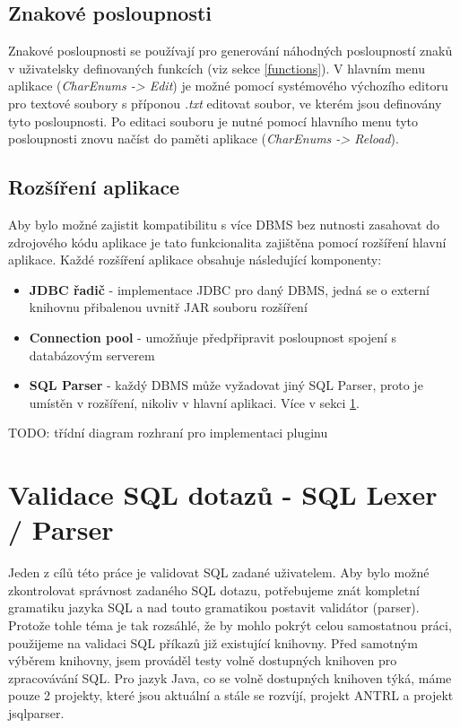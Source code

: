 \documentclass[czech,bachelor,public,dept460,male,cpdeclaration,twoside]{diploma}
\begin{document}
\subsection{Znakové posloupnosti} \label{charenums}
Znakové posloupnosti se používají pro generování náhodných posloupností znaků v uživatelsky definovaných funkcích (viz sekce \ref{functions}). V hlavním menu aplikace (\textit{CharEnums -> Edit}) je možné pomocí systémového výchozího editoru pro textové soubory s příponou \textit{.txt} editovat soubor, ve kterém jsou definovány tyto posloupnosti. Po editaci souboru je nutné pomocí hlavního menu tyto posloupnosti znovu načíst do paměti aplikace (\textit{CharEnums -> Reload}).

\subsection{Rozšíření aplikace} \label{plugins}
Aby bylo možné zajistit kompatibilitu s více DBMS bez nutnosti zasahovat do zdrojového kódu aplikace je tato funkcionalita zajištěna pomocí rozšíření hlavní aplikace. Každé rozšíření aplikace obsahuje následující komponenty:
\begin{itemize}
\item \textbf{JDBC řadič} - implementace JDBC pro daný DBMS, jedná se o externí knihovnu přibalenou uvnitř JAR souboru rozšíření
\item \textbf{Connection pool} - umožňuje předpřipravit posloupnost spojení s databázovým serverem
\item \textbf{SQL Parser} - každý DBMS může vyžadovat jiný SQL Parser, proto je umístěn v rozšíření, nikoliv v hlavní aplikaci. Více v sekci \ref{parsers}. 
\end{itemize}

TODO: třídní diagram rozhraní pro implementaci pluginu




\newpage
\section{Validace SQL dotazů - SQL Lexer / Parser} \label{parsers}
Jeden z cílů této práce je validovat SQL zadané uživatelem. Aby bylo možné zkontrolovat správnost zadaného SQL dotazu, potřebujeme znát kompletní gramatiku jazyka SQL a nad touto gramatikou postavit validátor (parser). Protože tohle téma je tak rozsáhlé, že by mohlo pokrýt celou samostatnou práci, použijeme na validaci SQL příkazů již existující knihovny. Před samotným výběrem knihovny, jsem prováděl testy volně dostupných knihoven pro zpracovávání SQL. Pro jazyk Java, co se volně dostupných knihoven týká, máme pouze 2 projekty, které jsou aktuální a stále se rozvíjí, projekt ANTRL a projekt jsqlparser.
\end{document}
